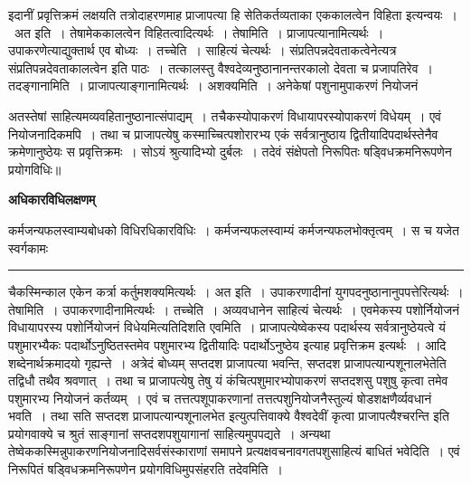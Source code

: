 \documentclass[11pt, openany]{book}
\newcommand\alfootnote[1]{%
  \begingroup
  \renewcommand\thefootnoteA{}\footnoteA{#1}%
  \addtocounter{footnoteA}{-1}%
  \endgroup
}
\begin{document}
 इदानीं प्रवृत्तिक्रमं लक्षयति तत्रोदाहरणमाह प्राजापत्या हि सेतिकर्तव्यताका एककालत्वेन विहिता इत्यन्वयः~।~{\br अत इति~।} तेषामेककालत्वेन विहितत्वादित्यर्थः~। {\br तेषामिति~।} प्राजापत्यानामित्यर्थः~। उपाकरणेत्याद्युक्तार्थ एव बोध्यः~। {\br तच्चेति~।}  साहित्यं चेत्यर्थः~। संप्रतिपन्नदेवताकत्वेनेत्यत्र {\qt संप्रतिपन्नदेवताकालत्वेन} इति पाठः~। तत्कालस्तु वैश्वदेव्यनुष्ठानानन्तरकालो देवता च प्रजापतिरेव~। {\br तदङ्गानामिति~।} प्राजापत्याङ्गानामित्यर्थः~। {\br अशक्यमिति~।} अनेकेषां पशुनामुपाकरणं नियोजनं
\alfootnote{टिप्प०\textemdash\ $^{1}$आग्नेययागानुष्ठानमित्यर्थः~।}
\newpage
\fancyhead[RE]{[ अधिकारविधि\textemdash\ }
{\bl\noindent अतस्तेषां
साहित्यमव्यवहितानुष्ठानात्संपाद्यम्~। तचैकस्योपाकरणं विधायापरस्योपाकरणं विधेयम्~। एवं नियोजनादिकमपि~। तथा च प्राजापत्येषु कस्माच्चित्पशोरारभ्य एकं सर्वत्रानुष्ठाय द्वितीयादिपदार्थस्तेनैव क्रमेणानुष्ठेयः स प्रवृत्तिक्रमः~। सोऽयं श्रुत्यादिभ्यो दुर्बलः~। तदेवं संक्षेपतो निरूपितः षड्विधक्रमनिरूपणेन प्रयोगविधिः॥}
\begin{center}
\textbf{अधिकारविधिलक्षणम्}    
\end{center}

{\bl कर्मजन्यफलस्वाम्यबोधको विधिरधिकारविधिः~। कर्मजन्यफलस्वाम्यं कर्मजन्यफलभोक्तृत्वम्~। स च {\qtl यजेत स्वर्गकामः}}\\
\hrule
\vspace{3mm}
\noindent
चैकस्मिन्काल एकेन कर्त्रा  कर्तुमशक्यमित्यर्थः~। {\br अत इति~।} उपाकरणादीनां युगपदनुष्ठानानुपपत्तेरित्यर्थः~। {\br तेषामिति~।} उपाकरणादीनामित्यर्थः~।
{\br तच्चेति~।}  अव्यवधानेन साहित्यं चेत्यर्थः~। एवमेकस्य पशोर्नियोजनं विधायापरस्य पशोर्नियोजनं विधेयमित्यतिदिशति {\br एवमिति~।} प्राजापत्येष्वेकस्य पदार्थस्य सर्वत्रानुष्ठेयत्वे यं पशुमारभ्यैकः पदार्थोऽनुष्ठितस्तमेव पशुमारभ्य द्वितीयादिः पदार्थोऽनुष्ठेय इत्याह प्रवृत्तिक्रम इत्यर्थः~।
{\qt आदि} शब्देनार्थक्रमादयो गृह्यन्ते~। {\br अत्रेदं बोध्यम्} {\qt सप्तदश प्राजापत्या भवन्ति, सप्तदश प्राजापत्यान्पशूनालभेतेति तद्विधौ तथैव श्रवणात्~}। तथा च
प्राजापत्येषु तेषु यं कंचित्पशुमारभ्योपाकरणं सप्तदशसु पशुषु कृत्वा तमेव पशुमारभ्य नियोजनं कर्तव्यम्~। एवं च तत्तत्पशूपाकरणानां तत्तत्पशुनियोजनैस्तुल्यं षोडशक्षणैर्व्यवधानं भवति~। तथा सति {\qt सप्तदश प्राजापत्यान्पशूनालभेत} इत्युत्पत्तिवाक्ये {\qt वैश्वदेवीं कृत्वा प्राजापत्यैश्चरन्ति} इति प्रयोगवाक्ये च श्रुतं साङ्गानां
सप्तदशपशुयागानां साहित्यमुपपद्यते~। अन्यथा तेष्वेककस्मिन्नुपाकरणनियोजनादिसर्वसंस्काराणां समापने प्रत्यक्षवचनावगतपशुसाहित्यं बाधितं भवेदिति~। एवं निरूपितं
षड्विधक्रमनिरूपणेन प्रयोगविधिमुपसंहरति {\br तदेवमिति~।}\\
\end{document}
